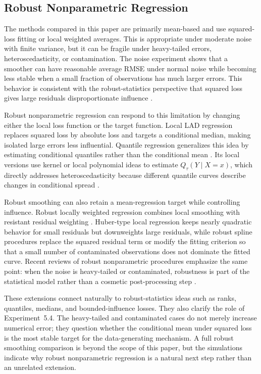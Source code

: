 \documentclass[12pt,a4paper]{article}
\begin{document}
\subsection{Robust Nonparametric Regression}

The methods compared in this paper are primarily mean-based and use squared-loss fitting or local weighted averages. This is appropriate under moderate noise with finite variance, but it can be fragile under heavy-tailed errors, heteroscedasticity, or contamination. The noise experiment shows that a smoother can have reasonable average RMSE under normal noise while becoming less stable when a small fraction of observations has much larger errors. This behavior is consistent with the robust-statistics perspective that squared loss gives large residuals disproportionate influence \citep{huber1964robust,huber2009robust}.

Robust nonparametric regression can respond to this limitation by changing either the local loss function or the target function. Local LAD regression replaces squared loss by absolute loss and targets a conditional median, making isolated large errors less influential. Quantile regression generalizes this idea by estimating conditional quantiles rather than the conditional mean \citep{koenker1978regression,koenker2005quantile}. Its local versions use kernel or local polynomial ideas to estimate \(Q_\tau(Y\mid X=x)\), which directly addresses heteroscedasticity because different quantile curves describe changes in conditional spread \citep{chaudhuri1991nonparametric,yu1998local}.

Robust smoothing can also retain a mean-regression target while controlling influence. Robust locally weighted regression combines local smoothing with resistant residual weighting \citep{cleveland1979robust}. Huber-type local regression keeps nearly quadratic behavior for small residuals but downweights large residuals, while robust spline procedures replace the squared residual term or modify the fitting criterion so that a small number of contaminated observations does not dominate the fitted curve. Recent reviews of robust nonparametric procedures emphasize the same point: when the noise is heavy-tailed or contaminated, robustness is part of the statistical model rather than a cosmetic post-processing step \citep{salibianbarrera2023robust}.

These extensions connect naturally to robust-statistics ideas such as ranks, quantiles, medians, and bounded-influence losses. They also clarify the role of Experiment~5.4. The heavy-tailed and contaminated cases do not merely increase numerical error; they question whether the conditional mean under squared loss is the most stable target for the data-generating mechanism. A full robust smoothing comparison is beyond the scope of this paper, but the simulations indicate why robust nonparametric regression is a natural next step rather than an unrelated extension.
\end{document}
